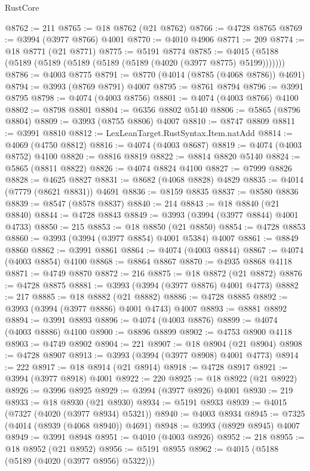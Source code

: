 \begin{lexlean}{RustCore}
\begin{coremodule}
@8762 := 211
@8765 := @18 @8762 (@21 @8762)
@8766 := @4728 @8765
@8769 := @3994 (@3977 @8766) @4001
@8770 := @4010 @4906
@8771 := 209
@8774 := @18 @8771 (@21 @8771)
@8775 := @5191 @8774
@8785 := @4015 (@5188 (@5189 (@5189 (@5189 (@5189 (@5189 (@4020 (@3977 @8775) @5199)))))))
@8786 := @4003 @8775
@8791 := @8770 (@4014 (@8785 (@4068 @8786)) @4691)
@8794 := @3993 (@8769 @8791) @4007
@8795 := @8761 @8794
@8796 := @3991 @8795
@8798 := @4074 (@4003 @8756)
@8801 := @4074 (@4003 @8766) @4100
@8802 := @8798 @8801
@8804 := @6356 @8802 @5140
@8806 := @5865 (@8796 @8804)
@8809 := @3993 (@8755 @8806) @4007
@8810 := @8747 @8809
@8811 := @3991 @8810
@8812 := LexLeanTarget.RustSyntax.Item.natAdd
@8814 := @4069 (@4750 @8812)
@8816 := @4074 (@4003 @8687)
@8819 := @4074 (@4003 @8752) @4100
@8820 := @8816 @8819
@8822 := @8814 @8820 @5140
@8824 := @5865 (@8811 @8822)
@8826 := @4074 @8824 @4100
@8827 := @7999 @8826
@8828 := @4625 @8827
@8831 := @8682 (@4068 @8828) @4829
@8835 := @4014 (@7779 (@8621 @8831)) @4691
@8836 := @8159 @8835
@8837 := @8580 @8836
@8839 := @8547 (@8578 @8837)
@8840 := 214
@8843 := @18 @8840 (@21 @8840)
@8844 := @4728 @8843
@8849 := @3993 (@3994 (@3977 @8844) @4001 @4733)
@8850 := 215
@8853 := @18 @8850 (@21 @8850)
@8854 := @4728 @8853
@8860 := @3993 (@3994 (@3977 @8854) @4001 @5384) @4007
@8861 := @8849 @8860
@8862 := @3991 @8861
@8864 := @4074 (@4003 @8844)
@8867 := @4074 (@4003 @8854) @4100
@8868 := @8864 @8867
@8870 := @4935 @8868 @4118
@8871 := @4749 @8870
@8872 := 216
@8875 := @18 @8872 (@21 @8872)
@8876 := @4728 @8875
@8881 := @3993 (@3994 (@3977 @8876) @4001 @4773)
@8882 := 217
@8885 := @18 @8882 (@21 @8882)
@8886 := @4728 @8885
@8892 := @3993 (@3994 (@3977 @8886) @4001 @4743) @4007
@8893 := @8881 @8892
@8894 := @3991 @8893
@8896 := @4074 (@4003 @8876)
@8899 := @4074 (@4003 @8886) @4100
@8900 := @8896 @8899
@8902 := @4753 @8900 @4118
@8903 := @4749 @8902
@8904 := 221
@8907 := @18 @8904 (@21 @8904)
@8908 := @4728 @8907
@8913 := @3993 (@3994 (@3977 @8908) @4001 @4773)
@8914 := 222
@8917 := @18 @8914 (@21 @8914)
@8918 := @4728 @8917
@8921 := @3994 (@3977 @8918) @4001
@8922 := 220
@8925 := @18 @8922 (@21 @8922)
@8926 := @3996 @8925
@8929 := @3994 (@3977 @8926) @4001
@8930 := 219
@8933 := @18 @8930 (@21 @8930)
@8934 := @5191 @8933
@8939 := @4015 (@7327 (@4020 (@3977 @8934) @5321))
@8940 := @4003 @8934
@8945 := @7325 (@4014 (@8939 (@4068 @8940)) @4691)
@8948 := @3993 (@8929 @8945) @4007
@8949 := @3991 @8948
@8951 := @4010 (@4003 @8926)
@8952 := 218
@8955 := @18 @8952 (@21 @8952)
@8956 := @5191 @8955
@8962 := @4015 (@5188 (@5189 (@4020 (@3977 @8956) @5322)))

\end{coremodule}
\end{lexlean}
